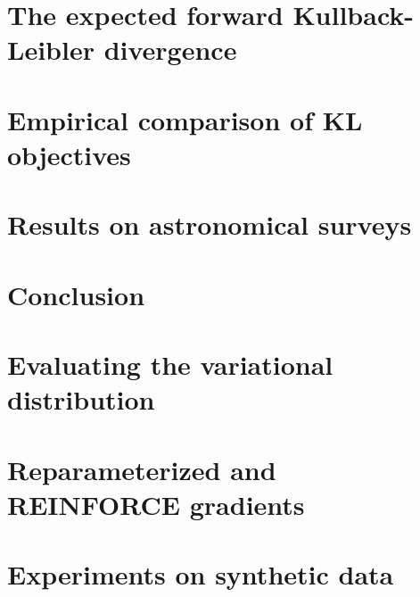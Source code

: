 \documentclass[twoside,11pt]{article}
\begin{document}
\section{The expected forward Kullback-Leibler divergence}
\label{sec:wake_sleep}




\section{Empirical comparison of KL objectives}


\section{Results on astronomical surveys}




\section{Conclusion}
\label{sec:conclusion}




\acks{}


\newpage

\appendix
\renewcommand\thefigure{A.\arabic{figure}}
\renewcommand\thetable{A.\arabic{table}}
\setcounter{figure}{0}
\setcounter{table}{0}


\section{Evaluating the variational distribution}
\label{sec:eval_var_distr}


\section{Reparameterized and REINFORCE gradients}
\label{sec:reparam_details}


\section{Experiments on synthetic data}

\end{document}
